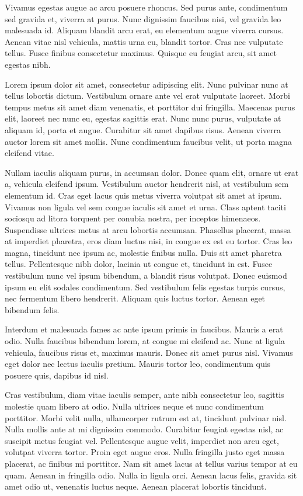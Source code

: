 Vivamus egestas augue ac arcu posuere rhoncus. Sed purus ante, condimentum sed gravida et, viverra at purus. Nunc dignissim faucibus nisi, vel gravida leo malesuada id. Aliquam blandit arcu erat, eu elementum augue viverra cursus. Aenean vitae nisl vehicula, mattis urna eu, blandit tortor. Cras nec vulputate tellus. Fusce finibus consectetur maximus. Quisque eu feugiat arcu, sit amet egestas nibh.

Lorem ipsum dolor sit amet, consectetur adipiscing elit. Nunc pulvinar nunc at tellus lobortis dictum. Vestibulum ornare ante vel erat vulputate laoreet. Morbi tempus metus sit amet diam venenatis, et porttitor dui fringilla. Maecenas purus elit, laoreet nec nunc eu, egestas sagittis erat. Nunc nunc purus, vulputate at aliquam id, porta et augue. Curabitur sit amet dapibus risus. Aenean viverra auctor lorem sit amet mollis. Nunc condimentum faucibus velit, ut porta magna eleifend vitae.

Nullam iaculis aliquam purus, in accumsan dolor. Donec quam elit, ornare ut erat a, vehicula eleifend ipsum. Vestibulum auctor hendrerit nisl, at vestibulum sem elementum id. Cras eget lacus quis metus viverra volutpat sit amet at ipsum. Vivamus non ligula vel sem congue iaculis sit amet et urna. Class aptent taciti sociosqu ad litora torquent per conubia nostra, per inceptos himenaeos. Suspendisse ultrices metus at arcu lobortis accumsan. Phasellus placerat, massa at imperdiet pharetra, eros diam luctus nisi, in congue ex est eu tortor. Cras leo magna, tincidunt nec ipsum ac, molestie finibus nulla. Duis sit amet pharetra tellus. Pellentesque nibh dolor, lacinia ut congue et, tincidunt in est. Fusce vestibulum nunc vel ipsum bibendum, a blandit risus volutpat. Donec euismod ipsum eu elit sodales condimentum. Sed vestibulum felis egestas turpis cursus, nec fermentum libero hendrerit. Aliquam quis luctus tortor. Aenean eget bibendum felis.

Interdum et malesuada fames ac ante ipsum primis in faucibus. Mauris a erat odio. Nulla faucibus bibendum lorem, at congue mi eleifend ac. Nunc at ligula vehicula, faucibus risus et, maximus mauris. Donec sit amet purus nisl. Vivamus eget dolor nec lectus iaculis pretium. Mauris tortor leo, condimentum quis posuere quis, dapibus id nisl.

Cras vestibulum, diam vitae iaculis semper, ante nibh consectetur leo, sagittis molestie quam libero at odio. Nulla ultrices neque et nunc condimentum porttitor. Morbi velit nulla, ullamcorper rutrum est at, tincidunt pulvinar nisl. Nulla mollis ante at mi dignissim commodo. Curabitur feugiat egestas nisl, ac suscipit metus feugiat vel. Pellentesque augue velit, imperdiet non arcu eget, volutpat viverra tortor. Proin eget augue eros. Nulla fringilla justo eget massa placerat, ac finibus mi porttitor. Nam sit amet lacus at tellus varius tempor at eu quam. Aenean in fringilla odio. Nulla in ligula orci. Aenean lacus felis, gravida sit amet odio ut, venenatis luctus neque. Aenean placerat lobortis tincidunt.

